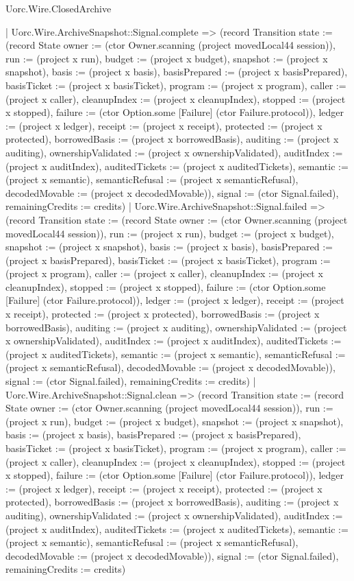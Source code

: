 \begin{lexlean}{Uorc.Wire.ClosedArchive}
\begin{semanticmodule}
{      | Uorc.Wire.ArchiveSnapshot::Signal.complete => (record Transition {state := (record State {owner := (ctor Owner.scanning (project movedLocal44 session)), run := (project x run), budget := (project x budget), snapshot := (project x snapshot), basis := (project x basis), basisPrepared := (project x basisPrepared), basisTicket := (project x basisTicket), program := (project x program), caller := (project x caller), cleanupIndex := (project x cleanupIndex), stopped := (project x stopped), failure := (ctor Option.some [Failure] (ctor Failure.protocol)), ledger := (project x ledger), receipt := (project x receipt), protected := (project x protected), borrowedBasis := (project x borrowedBasis), auditing := (project x auditing), ownershipValidated := (project x ownershipValidated), auditIndex := (project x auditIndex), auditedTickets := (project x auditedTickets), semantic := (project x semantic), semanticRefusal := (project x semanticRefusal), decodedMovable := (project x decodedMovable)}), signal := (ctor Signal.failed), remainingCredits := credits})
      | Uorc.Wire.ArchiveSnapshot::Signal.failed => (record Transition {state := (record State {owner := (ctor Owner.scanning (project movedLocal44 session)), run := (project x run), budget := (project x budget), snapshot := (project x snapshot), basis := (project x basis), basisPrepared := (project x basisPrepared), basisTicket := (project x basisTicket), program := (project x program), caller := (project x caller), cleanupIndex := (project x cleanupIndex), stopped := (project x stopped), failure := (ctor Option.some [Failure] (ctor Failure.protocol)), ledger := (project x ledger), receipt := (project x receipt), protected := (project x protected), borrowedBasis := (project x borrowedBasis), auditing := (project x auditing), ownershipValidated := (project x ownershipValidated), auditIndex := (project x auditIndex), auditedTickets := (project x auditedTickets), semantic := (project x semantic), semanticRefusal := (project x semanticRefusal), decodedMovable := (project x decodedMovable)}), signal := (ctor Signal.failed), remainingCredits := credits})
      | Uorc.Wire.ArchiveSnapshot::Signal.clean => (record Transition {state := (record State {owner := (ctor Owner.scanning (project movedLocal44 session)), run := (project x run), budget := (project x budget), snapshot := (project x snapshot), basis := (project x basis), basisPrepared := (project x basisPrepared), basisTicket := (project x basisTicket), program := (project x program), caller := (project x caller), cleanupIndex := (project x cleanupIndex), stopped := (project x stopped), failure := (ctor Option.some [Failure] (ctor Failure.protocol)), ledger := (project x ledger), receipt := (project x receipt), protected := (project x protected), borrowedBasis := (project x borrowedBasis), auditing := (project x auditing), ownershipValidated := (project x ownershipValidated), auditIndex := (project x auditIndex), auditedTickets := (project x auditedTickets), semantic := (project x semantic), semanticRefusal := (project x semanticRefusal), decodedMovable := (project x decodedMovable)}), signal := (ctor Signal.failed), remainingCredits := credits})
}
\end{semanticmodule}
\end{lexlean}
